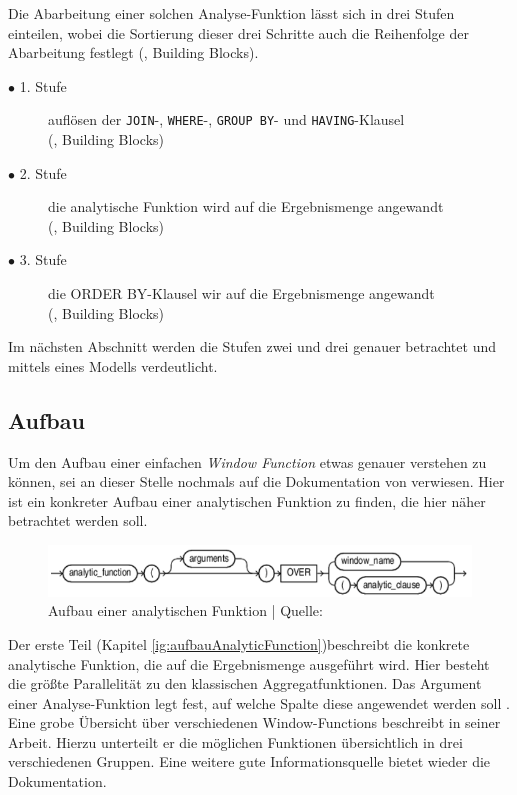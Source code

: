 Die Abarbeitung einer solchen Analyse-Funktion lässt sich in drei Stufen
einteilen, wobei die Sortierung dieser drei Schritte auch die Reihenfolge der Abarbeitung
festlegt (\cite{Nuijten2023}, Building Blocks).
\begin{description}
	\item[$\bullet$ 1. Stufe] auflösen der \texttt{JOIN}-, \texttt{WHERE}-, \texttt{GROUP
		BY}- und \texttt{HAVING}-Klausel \\ (\cite{Nuijten2023}, Building Blocks)

	\item[$\bullet$ 2. Stufe] die analytische Funktion wird auf die Ergebnismenge angewandt
		\\ (\cite{Nuijten2023}, Building Blocks)

	\item[$\bullet$ 3. Stufe] die ORDER BY-Klausel wir auf die Ergebnismenge angewandt
		\\ (\cite{Nuijten2023}, Building Blocks)
\end{description}
Im nächsten Abschnitt werden die Stufen zwei und drei genauer betrachtet und mittels
eines Modells verdeutlicht.

\subsection{Aufbau}
\label{sec:aufbau} Um den Aufbau einer einfachen \textit{Window Function} etwas
genauer verstehen zu können, sei an dieser Stelle nochmals auf die Dokumentation
von \citet{oracle} verwiesen. Hier ist ein konkreter Aufbau einer analytischen Funktion
zu finden, die hier näher betrachtet werden soll.
\begin{figure}[h]
	\centering
	\includegraphics[scale=0.5]{img/aufbauAnalyticFunction.jpg}
	\caption{ Aufbau einer analytischen Funktion | Quelle: \citep{oracle}}
	\label{fig:aufbauAnalyticFunction}
\end{figure}
Der erste Teil (Kapitel \ref{ig:aufbauAnalyticFunction})beschreibt die konkrete
analytische Funktion, die auf die Ergebnismenge ausgeführt wird. Hier besteht
die größte Parallelität zu den klassischen Aggregatfunktionen. Das Argument einer
Analyse-Funktion legt fest, auf welche Spalte diese angewendet werden soll
\citep[S.~110]{schicker2017datenbanken}. Eine grobe Übersicht über verschiedenen
Window-Functions beschreibt \citet[]{ibrahaim23} in seiner Arbeit. Hierzu
unterteilt er die möglichen Funktionen übersichtlich in drei verschiedenen
Gruppen. Eine weitere gute Informationsquelle bietet wieder die \citet{oracle}
Dokumentation.

